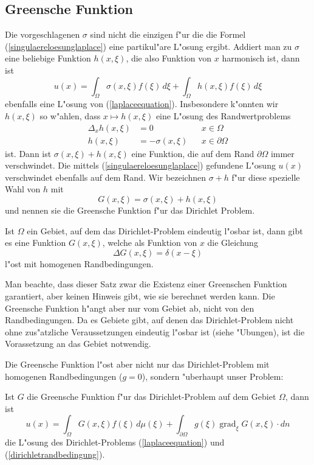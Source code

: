 \subsection{Greensche Funktion}
Die vorgeschlagenen $\sigma$ sind nicht die einzigen f"ur die die
Formel (\ref{singulaereloesunglaplace}) eine partikul"are L"osung ergibt.
Addiert man zu $\sigma$ eine beliebige Funktion $h(x,\xi)$, die
also Funktion von $x$ harmonisch ist, dann ist
\[
u(x)=\int_{\Omega}\sigma(x,\xi)f(\xi)\,d\xi+\int_{\Omega}h(x,\xi)f(\xi)\,d\xi
\]
ebenfalls eine L"osung von (\ref{laplaceequation}). Insbesondere
k"onnten wir $h(x,\xi)$ so w"ahlen, dass
$x\mapsto h(x,\xi)$ eine L"osung des Randwertproblems
\begin{align*}
\Delta_x h(x,\xi)&=0&&x\in\Omega\\
h(x,\xi)&=-\sigma(x,\xi)&&x\in\partial\Omega
\end{align*}
ist. Dann ist $\sigma(x,\xi)+h(x,\xi)$ eine Funktion, die auf dem
Rand $\partial\Omega$ immer verschwindet. Die mittels
(\ref{singulaereloesunglaplace}) gefundene L"osung $u(x)$
verschwindet ebenfalls auf dem Rand.
Wir bezeichnen $\sigma+h$ f"ur diese spezielle Wahl von $h$ mit
\[
G(x,\xi)=\sigma(x,\xi)+h(x,\xi)
\]
und nennen sie die Greensche Funktion f"ur das Dirichlet Problem.

\begin{satz}Ist $\Omega$ ein Gebiet, auf dem das Dirichlet-Problem
eindeutig l"osbar ist, dann gibt es eine 
Funktion $G(x,\xi)$,
welche als Funktion von $x$ die Gleichung
\[
\Delta G(x,\xi)=\delta(x-\xi)
\]
l"ost mit homogenen Randbedingungen.
\end{satz}

Man beachte, dass dieser Satz zwar die Existenz einer Greenschen Funktion
garantiert, aber keinen Hinweis gibt, wie sie berechnet werden kann.
Die Greensche Funktion h"angt aber nur vom Gebiet ab, nicht von den
Randbedingungen.
Da es Gebiete gibt, auf denen das Dirichlet-Problem nicht ohne zus"atzliche
Veraussetzungen eindeutig l"osbar ist (siehe "Ubungen), ist die
Vorassetzung an das Gebiet notwendig.

Die Greensche Funktion l"ost aber nicht nur das Dirichlet-Problem
mit homogenen Randbedingungen ($g=0$), sondern "uberhaupt
unser Problem:

\begin{satz}
\label{dirichletloesung}
Ist $G$ die Greensche Funktion f"ur das Dirichlet-Problem auf dem
Gebiet $\Omega$, dann ist
\[
u(x)=\int_{\Omega}G(x,\xi)f(\xi)\,d\mu(\xi)+\int_{\partial\Omega}g(\xi)\operatorname{grad}_\xi G(x,\xi)\cdot dn
\]
die L"osung des Dirichlet-Problems (\ref{laplaceequation}) und
(\ref{dirichletrandbedingung}).
\end{satz}


